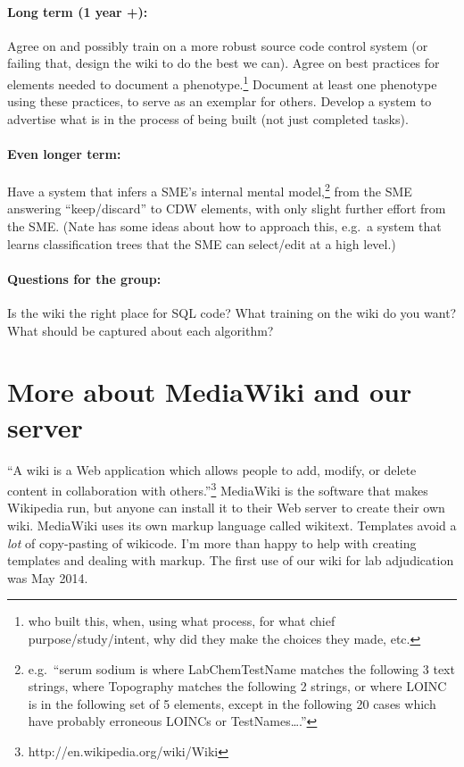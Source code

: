 \documentclass{tufte-handout}
\begin{document}
\paragraph{Long term (1 year +):} Agree on and possibly train on a more
robust source code control system (or failing that, design the wiki to do
the best we can). Agree on best practices for elements needed to document
a phenotype.\footnote{who built this, when, using what process, for
  what chief purpose/study/intent, why did they make the choices they
  made, etc.} Document at least one phenotype using these practices,
to serve as an exemplar for others. Develop a system to advertise what is in the
process of being built (not just completed tasks).

\paragraph{Even longer term:} Have a system that infers a SME's internal mental
model,\footnote{e.g.\ ``serum sodium is where LabChemTestName matches
  the following 3 text strings, where Topography matches the following
  2 strings, or where LOINC is in the following set of 5 elements,
  except in the following 20 cases which have probably erroneous
  LOINCs or TestNames\ldots{}.''} from the SME answering
``keep/discard'' to CDW elements, with only slight further effort from
the SME. (Nate has some ideas about how to approach this, e.g.\ a system that learns
classification trees that the SME can select/edit at a high level.)

\paragraph{Questions for the group:} Is the wiki the right place for
SQL code? What training on the wiki do you want? What should be
captured about each algorithm?

\section{More about MediaWiki and our server}

``A wiki is a Web application which allows people to add, modify, or
delete content in collaboration with
others.''\footnote{http://en.wikipedia.org/wiki/Wiki} MediaWiki is the
software that makes Wikipedia run, but anyone can install it to their
Web server to create their own wiki. MediaWiki uses its own markup
language called wikitext. Templates avoid a \emph{lot} of copy-pasting
of wikicode. I'm more than happy to help with creating templates and dealing with markup. The first use of our wiki for lab adjudication was May 2014.
\end{document}
